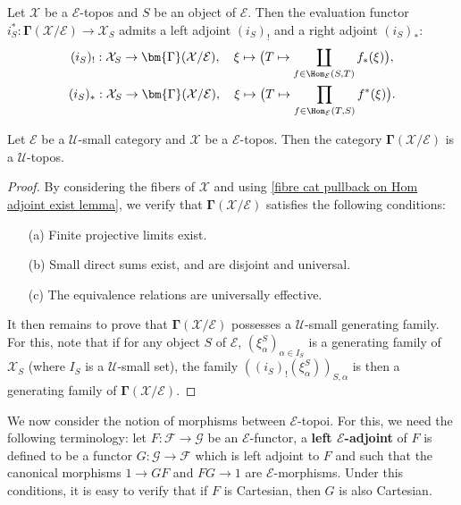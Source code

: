 \begin{corollary}\label{topos fibre evaluation functor adjoint char}
Let $\mathcal{X}$ be a $\mathcal{E}$-topos and $S$ be an object of $\mathcal{E}$. Then the evaluation functor $i_S^*:\bm{\Gamma}(\mathcal{X}/\mathcal{E})\to \mathcal{X}_S$ admits a left adjoint $(i_S)_!$ and a right adjoint $(i_S)_*$:
\begin{gather}
(i_S)_!:\mathcal{X}_S\to \bm{\Gamma}(\mathcal{X}/\mathcal{E}), \quad \xi \mapsto \big(T\mapsto\coprod_{f\in\Hom_\mathcal{E}(S,T)}f_*(\xi)\big),\label{topos fibre evaluation functor adjoint char-1}\\
(i_S)_*:\mathcal{X}_S\to \bm{\Gamma}(\mathcal{X}/\mathcal{E}), \quad \xi \mapsto \big(T\mapsto\prod_{f\in\Hom_\mathcal{E}(T,S)}f^*(\xi)\big).\label{topos fibre evaluation functor adjoint char-2}
\end{gather}
\end{corollary}

\begin{proposition}\label{topos fibre section category is topos}
Let $\mathcal{E}$ be a $\mathscr{U}$-small category and $\mathcal{X}$ be a $\mathcal{E}$-topos. Then the category $\bm{\Gamma}(\mathcal{X}/\mathcal{E})$ is a $\mathscr{U}$-topos.
\end{proposition}
\begin{proof}
By considering the fibers of $\mathcal{X}$ and using \cref{fibre cat pullback on Hom adjoint exist lemma}, we verify that $\bm{\Gamma}(\mathcal{X}/\mathcal{E})$ satisfies the following conditions:
\begin{enumerate}
\item[(a)] Finite projective limits exist.
\item[(b)] Small direct sums exist, and are disjoint and universal.
\item[(c)] The equivalence relations are universally effective.
\end{enumerate}
It then remains to prove that $\bm{\Gamma}(\mathcal{X}/\mathcal{E})$ possesses a $\mathscr{U}$-small generating family. For this, note that if for any object $S$ of $\mathcal{E}$, $(\xi^S_\alpha)_{\alpha\in I_S}$ is a generating family of $\mathcal{X}_S$ (where $I_S$ is a $\mathscr{U}$-small set), the family $((i_S)_!(\xi^S_\alpha))_{S,\alpha}$ is then a generating family of $\bm{\Gamma}(\mathcal{X}/\mathcal{E})$.
\end{proof}

We now consider the notion of morphisms between $\mathcal{E}$-topoi. For this, we need the following terminology: let $F:\mathcal{F}\to\mathcal{G}$ be an $\mathcal{E}$-functor, a \textbf{left $\mathcal{E}$-adjoint} of $F$ is defined to be a functor $G:\mathcal{G}\to\mathcal{F}$ which is left adjoint to $F$ and such that the canonical morphisms $1\to GF$ and $FG\to 1$ are $\mathcal{E}$-morphisms. Under this conditions, it is easy to verify that if $F$ is Cartesian, then $G$ is also Cartesian.

